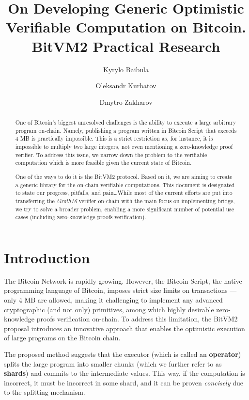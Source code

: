 \documentclass{iacrtrans}
\author{Kyrylo Baibula \inst{1} \and Oleksandr Kurbatov\inst{1} \and
Dmytro Zakharov\inst{1}}
\institute{Distributed Lab
  \email{dmytro.zakharov@distributedlab.com},
\email{ok@distributedlab.com}, \email{kyrylo.baybula@distributedlab.com}}
\title[Verifiable Computation on Bitcoin]{On Developing Generic Optimistic Verifiable Computation on Bitcoin. BitVM2 Practical Research}
\begin{document}
\maketitle


\begin{abstract}
  One of Bitcoin's biggest unresolved challenges is the ability to execute 
  a large arbitrary program on-chain. Namely, publishing a program written in 
  Bitcoin Script that exceeds 4 MB is practically impossible. 
  This is a strict restriction as, for instance, it 
  is impossible to multiply two large integers, 
  not even mentioning a zero-knowledge proof verifier. To
  address this issue, we narrow down the problem to the verifiable computation
  which is more feasible given the current state of Bitcoin.

  One of the ways to do it is the BitVM2 protocol. Based on it, we are aiming to create a generic library for the on-chain verifiable computations. This document is designated to state our progress, pitfalls, and pain\ldots While most of the current efforts are put into transferring the \textit{Groth16} verifier on-chain with the main focus on implementing bridge, we try to solve a broader problem, enabling a more significant number of potential use cases (including zero-knowledge proofs verification).
\end{abstract}

\setcounter{tocdepth}{2}
\tableofcontents

\section{Introduction}\label{sec:intro}

The Bitcoin Network \autocite{bitcoin_paper} is rapidly growing. However, the Bitcoin Script, the native programming language of Bitcoin, imposes strict size limits on transactions --- only 4 MB are allowed, making it challenging to implement any advanced cryptographic (and not only) primitives, among which highly desirable zero-knowledge proofs verification on-chain. To address this limitation, the BitVM2 \autocite{bitvm2} proposal introduces an innovative approach that enables the optimistic execution of large programs on the Bitcoin chain. 

The proposed method suggests that the executor (which is called an \textbf{operator}) splits the large program into smaller chunks (which we further refer to as \textbf{shards}) and commits to the intermediate values. This way, if the computation is incorrect, it must be incorrect in some shard, and it can be proven \textit{concisely} due to the splitting mechanism.
\end{document}
